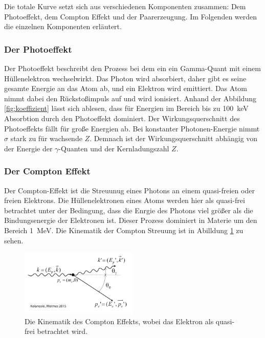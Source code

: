 Die totale Kurve setzt sich aus verschiedenen Komponenten zusammen: Dem Photoeffekt, dem Compton Effekt und der Paarerzeugung.
Im Folgenden werden die einzelnen Komponenten erläutert.

\subsubsection{Der Photoeffekt}
\label{sec:photoeffekt}

Der Photoeffekt beschreibt den Prozess bei dem ein ein Gamma-Quant mit einem Hüllenelektron wechselwirkt.
Das Photon wird absorbiert, daher gibt es seine gesamte Energie an das Atom ab, und ein Elektron wird emittiert. 
Das Atom nimmt dabei den Rückstoßimpuls auf und wird ionisiert.
Anhand der Abbildung \ref{fig:koeffizient} lässt sich ablesen, dass für Energien im Bereich bis zu \qty{100}{\kilo\eV} 
Absorbtion durch den Photoeffekt dominiert. Der Wirkungsquerschnitt des Photoeffekts fällt für große Energien ab.
Bei konstanter Photonen-Energie nimmt $\sigma$ stark zu für wachsende $Z$.
Demnach ist der Wirkungsquerschnitt abhängig von der Energie der $\gamma$-Quanten und der Kernladungszahl $Z$.

\subsubsection{Der Compton Effekt}
\label{sec:compton}

Der Compton-Effekt ist die Streuunug eines Photons an einem quasi-freien oder freien Elektrons.
Die Hüllenelektronen eines Atoms werden hier als quasi-frei betrachtet unter der Bedingung, dass
die Enrgie des Photons viel größer als die Bindungsenergie der Elektronen ist. Dieser Prozess
dominiert in Materie um den Bereich \qty{1}{\mega\eV}.
Die Kinematik der Compton Streuung ist in Abilldung \ref{fig:compton} zu sehen.

\begin{figure}[H]
    \centering
    \includegraphics[width=0.5\textwidth]{content/grafik/compton.jpg}
    \caption{Die Kinematik des Compton Effekts, wobei das Elektron als quasi-frei betrachtet wird.\cite{teilchendetektoren}}
    \label{fig:compton}
\end{figure}


